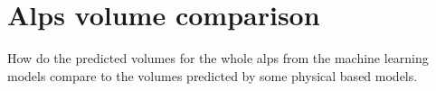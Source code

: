 \section{Alps volume comparison}\label{Alpscomp}
How do the predicted volumes for the whole alps from the machine learning models compare to the volumes predicted by some physical based models.

%
%
%
